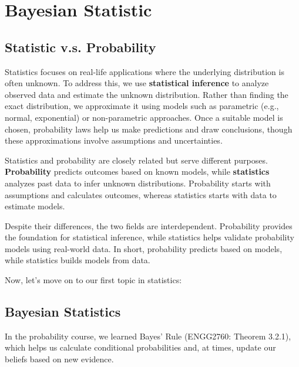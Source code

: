 \chapter{Bayesian Statistic}

\section{Statistic v.s. Probability}

Statistics focuses on real-life applications where the underlying distribution is often unknown. To address this, we use \textbf{statistical inference} to analyze observed data and estimate the unknown distribution. Rather than finding the exact distribution, we approximate it using models such as parametric (e.g., normal, exponential) or non-parametric approaches. Once a suitable model is chosen, probability laws help us make predictions and draw conclusions, though these approximations involve assumptions and uncertainties.  

Statistics and probability are closely related but serve different purposes. \textbf{Probability} predicts outcomes based on known models, while \textbf{statistics} analyzes past data to infer unknown distributions. Probability starts with assumptions and calculates outcomes, whereas statistics starts with data to estimate models.  

Despite their differences, the two fields are interdependent. Probability provides the foundation for statistical inference, while statistics helps validate probability models using real-world data. In short, probability predicts based on models, while statistics builds models from data.  

Now, let's move on to our first topic in statistics: 


\section{Bayesian Statistics}
In the probability course, we learned Bayes' Rule (ENGG2760: Theorem 3.2.1), which helps us calculate conditional probabilities and, at times, update our beliefs based on new evidence.

